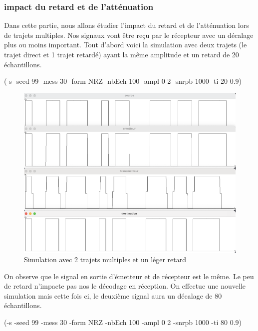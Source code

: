 \subsubsection{impact du retard et de l'atténuation}
Dans cette partie, nous allons étudier l'impact du retard et de l'atténuation lors de trajets multiples. Nos signaux vont être reçu par le récepteur avec un décalage plus ou moins important. Tout d'abord voici la simulation avec deux trajets (le trajet direct et 1 trajet retardé) ayant la même amplitude et un retard de 20 échantillons.

(-s  -seed  99  -mess  30  -form  NRZ  -nbEch  100  -ampl  0  2  -snrpb  1000  -ti  20 0.9)

\begin{figure}[H]
\centering
\includegraphics[width=\textwidth]{img/peuretard.png}
\caption{\label{fig:image25}Simulation avec 2 trajets multiples et un léger retard}
\end{figure}

On observe que le signal en sortie d'émetteur et de récepteur est le même. Le peu de retard n'impacte pas nos le décodage en réception. On effectue une nouvelle simulation mais cette fois ci, le deuxième signal aura un décalage de 80 échantillons.

(-s  -seed  99  -mess  30  -form  NRZ  -nbEch  100  -ampl  0  2  -snrpb  1000  -ti  80 0.9)

